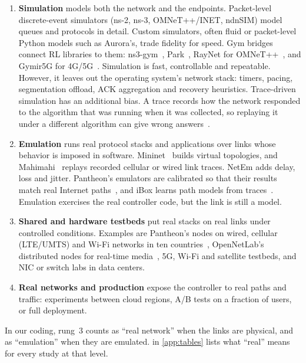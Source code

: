 \begin{enumerate}
  \item \textbf{Simulation} models both the network and the endpoints. Packet-level discrete-event simulators (ns-2, ns-3, OMNeT++/INET, ndnSIM) model queues and protocols in detail. Custom simulators, often fluid or packet-level Python models such as Aurora's, trade fidelity for speed. Gym bridges connect RL libraries to them: ns3-gym~\cite{gawlowicz2019ns3gym}, Park~\cite{mao2019park}, RayNet for OMNeT++~\cite{giacomoni2024raynet}, and Gymir5G for 4G/5G~\cite{smirnov2024gymir5g}. Simulation is fast, controllable and repeatable. However, it leaves out the operating system's network stack: timers, pacing, segmentation offload, ACK aggregation and recovery heuristics. Trace-driven simulation has an additional bias. A trace records how the network responded to the algorithm that was running when it was collected, so replaying it under a different algorithm can give wrong answers~\cite{bartulovic2017biases,alomar2023causalsim}.
  \item \textbf{Emulation} runs real protocol stacks and applications over links whose behavior is imposed in software. Mininet~\cite{lantz2010mininet} builds virtual topologies, and Mahimahi~\cite{netravali2015mahimahi} replays recorded cellular or wired link traces. NetEm adds delay, loss and jitter. Pantheon's emulators are calibrated so that their results match real Internet paths~\cite{yan2018pantheon}, and iBox learns path models from traces~\cite{ashok2020ibox,ashok2022data}. Emulation exercises the real controller code, but the link is still a model.
  \item \textbf{Shared and hardware testbeds} put real stacks on real links under controlled conditions. Examples are Pantheon's nodes on wired, cellular (LTE/UMTS) and Wi-Fi networks in ten countries~\cite{yan2018pantheon}, OpenNetLab's distributed nodes for real-time media~\cite{eo2022opennetlab}, 5G, Wi-Fi and satellite testbeds, and NIC or switch labs in data centers.
  \item \textbf{Real networks and production} expose the controller to real paths and traffic: experiments between cloud regions, A/B tests on a fraction of users, or full deployment.
\end{enumerate}

\noindent In our coding, rung~3 counts as ``real network'' when the links are physical, and as ``emulation'' when they are emulated.  in \cref{app:tables} lists what ``real'' means for every study at that level.

